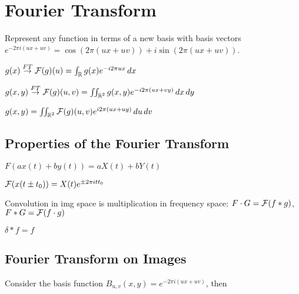 \section{Fourier Transform}
Represent any function in terms of a new basis with basis vectors \(e^{-2\pi i(ux + uv)} = \cos(2\pi(ux + uv)) + i \sin(2\pi(ux + uv))\).

\begin{definition}[1D-FT]
  \(g(x) \overset{FT}{\to} \operatorname{\mathcal{F}}(g)(u) = \int_{\operatorname{\mathbb{R}}} g(x) e^{-i2\pi ux} \, dx\)
\end{definition}

\begin{definition}[2D-FT]
  \(g(x, y) \overset{FT}{\to} \operatorname{\mathcal{F}}(g)(u, v) = \iint_{\operatorname{\mathbb{R}}^2} g(x, y) e^{-i2\pi (ux + vy)} \,dx \,dy\)
\end{definition}

\begin{definition}[Inverse FT]
  \(g(x, y) = \iint_{\operatorname{\mathbb{R}}^2} \operatorname{\mathcal{F}}(g)(u, v) e^{i2\pi(ux + uy)} \,du \,dv\)
\end{definition}

\subsection{Properties of the Fourier Transform}

\begin{definition}[Linearity]
  \(F(ax(t) + by(t)) = a X(t) + b Y(t)\)
\end{definition}

\begin{definition}
  \(\operatorname{\mathcal{F}}(x(t \pm t_0)) = X(t)e^{\pm 2 \pi i t t_0}\)
\end{definition}

\begin{algorithm}
  Convolution in img space is multiplication in frequency space: \(F \cdot G = \operatorname{\mathcal{F}}(f \ast g)\), \(F \ast G = \operatorname{\mathcal{F}}(f \cdot g)\)
\end{algorithm}

\begin{definition}
  \(\delta \ast f = f\)
\end{definition}

\subsection{Fourier Transform on Images}

Consider the basis function \(B_{u,v}(x, y) = e^{-2\pi i(ux + uv)}\), then

